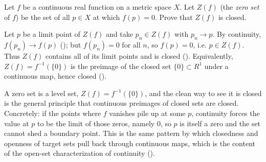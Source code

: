\documentclass[main.tex]{subfiles}
\begin{document}
Let $f$ be a continuous real function on a metric space $X$. Let $Z(f)$ (the \textit{zero set} of $f$) be the set of all $p \in X$ at which $f(p) = 0$. Prove that $Z(f)$ is closed.
\begin{Solution}
Let $p$ be a limit point of $Z(f)$ and take $p_{n} \in Z(f)$ with $p_{n} \to p$. By continuity, $f(p_{n}) \to f(p)$ (); but $f(p_{n}) = 0$ for all $n$, so $f(p) = 0$, i.e. $p \in Z(f)$. Thus $Z(f)$ contains all of its limit points and is closed (). Equivalently, $Z(f) = f^{-1}(\{0\})$ is the preimage of the closed set $\{0\} \subset R^{1}$ under a continuous map, hence closed ().
\end{Solution}
\begin{Reflection}
A zero set is a level set, $Z(f) = f^{-1}(\{0\})$, and the clean way to see it is closed is the general principle that continuous preimages of closed sets are closed. Concretely: if the points where $f$ vanishes pile up at some $p$, continuity forces the value at $p$ to be the limit of those zeros, namely $0$, so $p$ is itself a zero and the set cannot shed a boundary point. This is the same pattern by which closedness and openness of target sets pull back through continuous maps, which is the content of the open-set characterization of continuity ().
\end{Reflection}
\end{document}
